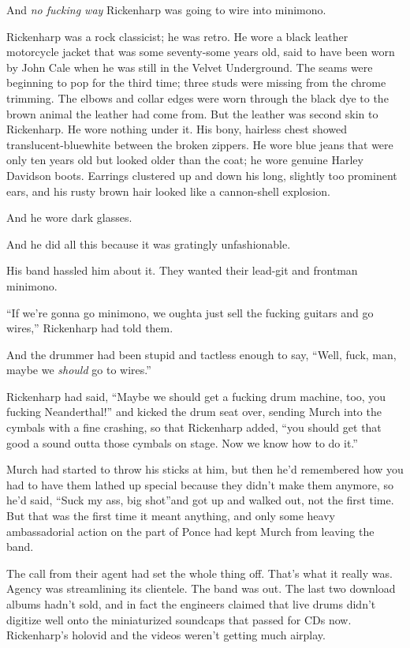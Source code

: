 And \textit{no fucking way} Rickenharp was going to wire into minimono.

Rickenharp was a rock classicist; he was retro. He wore a black leather motorcycle jacket that was some seventy-some years old, said to have been worn by John Cale when he was still in the Velvet Underground. The seams were beginning to pop for the third time; three studs were missing from the chrome trimming. The elbows and collar edges were worn through the black dye to the brown animal the leather had come from. But the leather was second skin to Rickenharp. He wore nothing under it. His bony, hairless chest showed translucent-bluewhite between the broken zippers. He wore blue jeans that were only ten years old but looked older than the coat; he wore genuine Harley Davidson boots. Earrings clustered up and down his long, slightly too prominent ears, and his rusty brown hair looked like a cannon-shell explosion.

And he wore dark glasses.

And he did all this because it was gratingly unfashionable.

His band hassled him about it. They wanted their lead-git and frontman minimono.

``If we're gonna go minimono, we oughta just sell the fucking guitars and go wires,'' Rickenharp had told them.

And the drummer had been stupid and tactless enough to say, ``Well, fuck, man, maybe we \textit{should} go to wires.''

Rickenharp had said, ``Maybe we should get a fucking drum machine, too, you fucking Neanderthal!'' and kicked the drum seat over, sending Murch into the cymbals with a fine crashing, so that Rickenharp added, ``you should get that good a sound outta those cymbals on stage. Now we know how to do it.''

Murch had started to throw his sticks at him, but then he'd remembered how you had to have them lathed up special because they didn't make them anymore, so he'd said, ``Suck my ass, big shot''and got up and walked out, not the first time. But that was the first time it meant anything, and only some heavy ambassadorial action on the part of Ponce had kept Murch from leaving the band.

The call from their agent had set the whole thing off. That's what it really was. Agency was streamlining its clientele. The band was out. The last two download albums hadn't sold, and in fact the engineers claimed that live drums didn't digitize well onto the miniaturized soundcaps that passed for CDs now. Rickenharp's holovid and the videos weren't getting much airplay.

